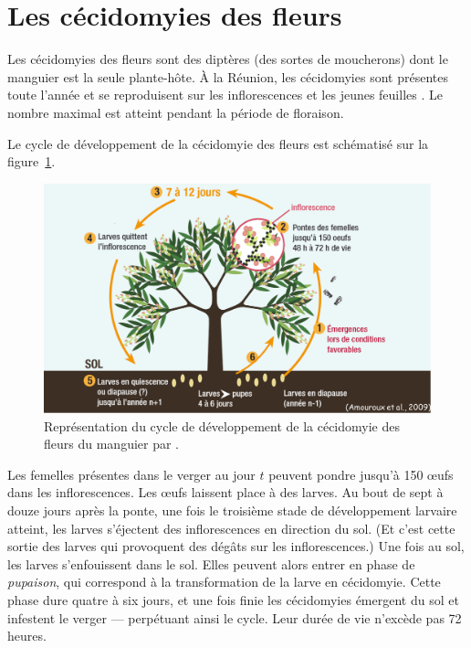 \section{Les cécidomyies des fleurs}
\label{chap:cecido}

Les cécidomyies des fleurs sont des diptères (des sortes de moucherons) dont le manguier est la seule plante-hôte.
À la Réunion, les cécidomyies sont présentes toute l'année et se reproduisent sur les inflorescences et les jeunes feuilles \citep{paul}.
Le nombre maximal est atteint pendant la période de floraison.


Le cycle de développement de la cécidomyie des fleurs est schématisé sur la figure~\ref{fig:cycle}.
%
\begin{figure}
 \centering
 \includegraphics[scale = 0.33]{photos/cycle.png}
 \caption{Représentation du cycle de développement de la cécidomyie des fleurs du manguier par \citet{paulguide}.}
 \label{fig:cycle}
\end{figure}
%
Les femelles présentes dans le verger au jour $t$ peuvent pondre jusqu'à 150 œufs dans les inflorescences.
Les œufs laissent place à des larves.
Au bout de sept à douze jours après la ponte, une fois le troisième stade de développement larvaire atteint, les larves s'éjectent des inflorescences en direction du sol.
(Et c'est cette sortie des larves qui provoquent des dégâts sur les inflorescences.)
Une fois au sol, les larves s'enfouissent dans le sol. Elles peuvent alors entrer en phase de \emph{pupaison}, qui correspond à la transformation de la larve en cécidomyie.
Cette phase dure quatre à six jours, et une fois finie les cécidomyies émergent du sol et infestent le verger --- perpétuant ainsi le cycle. 
Leur durée de vie n'excède pas 72 heures.

